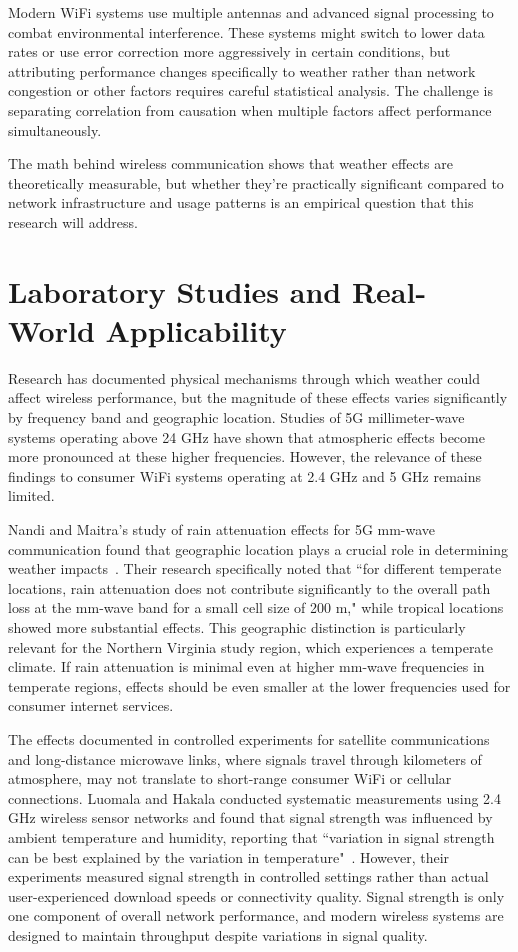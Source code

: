 \documentclass[11pt]{report}
\begin{document}
Modern WiFi systems use multiple antennas and advanced signal processing to combat environmental interference. These systems might switch to lower data rates or use error correction more aggressively in certain conditions, but attributing performance changes specifically to weather rather than network congestion or other factors requires careful statistical analysis. The challenge is separating correlation from causation when multiple factors affect performance simultaneously.

The math behind wireless communication shows that weather effects are theoretically measurable, but whether they're practically significant compared to network infrastructure and usage patterns is an empirical question that this research will address.

\section{Laboratory Studies and Real-World Applicability}

Research has documented physical mechanisms through which weather could affect wireless performance, but the magnitude of these effects varies significantly by frequency band and geographic location. Studies of 5G millimeter-wave systems operating above 24 GHz have shown that atmospheric effects become more pronounced at these higher frequencies. However, the relevance of these findings to consumer WiFi systems operating at 2.4 GHz and 5 GHz remains limited.

Nandi and Maitra's study of rain attenuation effects for 5G mm-wave communication found that geographic location plays a crucial role in determining weather impacts~\cite{nandi2018rain}. Their research specifically noted that ``for different temperate locations, rain attenuation does not contribute significantly to the overall path loss at the mm-wave band for a small cell size of 200 m," while tropical locations showed more substantial effects. This geographic distinction is particularly relevant for the Northern Virginia study region, which experiences a temperate climate. If rain attenuation is minimal even at higher mm-wave frequencies in temperate regions, effects should be even smaller at the lower frequencies used for consumer internet services.

The effects documented in controlled experiments for satellite communications and long-distance microwave links, where signals travel through kilometers of atmosphere, may not translate to short-range consumer WiFi or cellular connections. Luomala and Hakala conducted systematic measurements using 2.4 GHz wireless sensor networks and found that signal strength was influenced by ambient temperature and humidity, reporting that ``variation in signal strength can be best explained by the variation in temperature"~\cite{luomala2015effects}. However, their experiments measured signal strength in controlled settings rather than actual user-experienced download speeds or connectivity quality. Signal strength is only one component of overall network performance, and modern wireless systems are designed to maintain throughput despite variations in signal quality.
\end{document}
